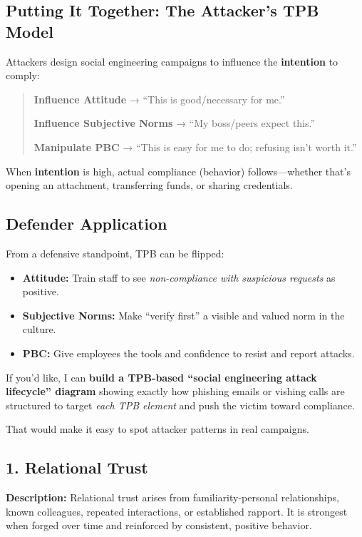 \subsection{\textbf{Putting It Together: The Attacker’s TPB Model}}

Attackers design social engineering campaigns to influence the \textbf{intention} to comply:

\begin{quote}
\textbf{Influence Attitude} → “This is good/necessary for me.”

 \textbf{Influence Subjective Norms} → “My boss/peers expect this.”

 \textbf{Manipulate PBC} → “This is easy for me to do; refusing isn’t worth it.”

\end{quote}

When \textbf{intention} is high, actual compliance (behavior) follows—whether that’s opening an attachment, transferring funds, or sharing credentials.

\subsection{\textbf{Defender Application}}

From a defensive standpoint, TPB can be flipped:

\begin{itemize}
    \item \textbf{Attitude:} Train staff to see \textit{non-compliance with suspicious requests} as positive.
    \item \textbf{Subjective Norms:} Make “verify first” a visible and valued norm in the culture.
    \item \textbf{PBC:} Give employees the tools and confidence to resist and report attacks.
\end{itemize}
If you’d like, I can \textbf{build a TPB-based “social engineering attack lifecycle” diagram} showing exactly how phishing emails or vishing calls are structured to target \textit{each TPB element} and push the victim toward compliance.

 That would make it easy to spot attacker patterns in real campaigns.



\subsection{1. Relational Trust}
\textbf{Description:} Relational trust arises from familiarity-personal relationships, known colleagues, repeated interactions, or established rapport. It is strongest when forged over time and reinforced by consistent, positive behavior.

